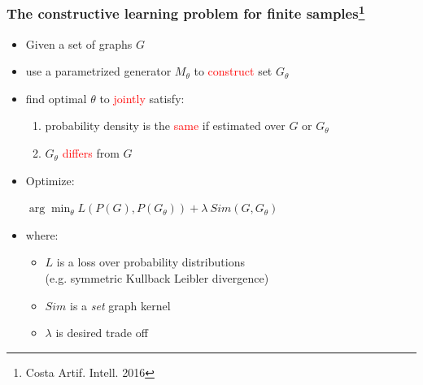 \documentclass{beamer}
\newcommand{\red}[1]{\textcolor{red}{#1}}
\begin{document}
\begin{frame}
\frametitle{The constructive learning problem for finite samples\footnote{Costa Artif. Intell. 2016}}
    \begin{itemize}
        \item Given a set of graphs $G$
        \item use a parametrized generator $M_\theta$ to \red{construct} set $G_\theta$
        \item find optimal $\theta$ to \red{jointly} satisfy:
            \begin{enumerate}
        \item probability density is the \red{same} if estimated over $G$ or $G_\theta$
        \item $G_\theta$ \red{differs} from $G$
            \end{enumerate}
        \item Optimize:\\ \begin{center} $\arg \min_\theta L(P(G),P(G_\theta)) + \lambda  ~ Sim(G, G_\theta)$ \end{center}
        \item where:
        \begin{itemize}
            \item $L$ is a loss over probability distributions \\(e.g. symmetric Kullback Leibler divergence)
            \item $Sim$ is a {\em set} graph kernel
            \item $\lambda$ is desired trade off
        \end{itemize}
    
    \end{itemize}
\end{frame}
\end{document}
